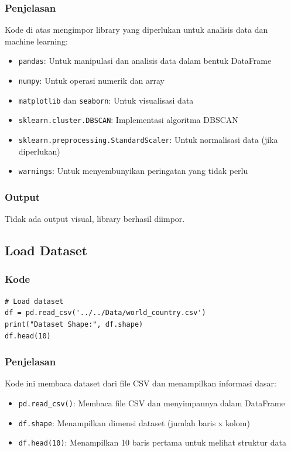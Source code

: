 \documentclass[12pt,a4paper]{article}
\begin{document}
\subsubsection{Penjelasan}
Kode di atas mengimpor library yang diperlukan untuk analisis data dan machine learning:
\begin{itemize}
    \item \texttt{pandas}: Untuk manipulasi dan analisis data dalam bentuk DataFrame
    \item \texttt{numpy}: Untuk operasi numerik dan array
    \item \texttt{matplotlib} dan \texttt{seaborn}: Untuk visualisasi data
    \item \texttt{sklearn.cluster.DBSCAN}: Implementasi algoritma DBSCAN
    \item \texttt{sklearn.preprocessing.StandardScaler}: Untuk normalisasi data (jika diperlukan)
    \item \texttt{warnings}: Untuk menyembunyikan peringatan yang tidak perlu
\end{itemize}

\subsubsection{Output}
Tidak ada output visual, library berhasil diimpor.

\subsection{Load Dataset}

\subsubsection{Kode}
\begin{lstlisting}[style=pythonstyle]
# Load dataset
df = pd.read_csv('../../Data/world_country.csv')
print("Dataset Shape:", df.shape)
df.head(10)
\end{lstlisting}

\subsubsection{Penjelasan}
Kode ini membaca dataset dari file CSV dan menampilkan informasi dasar:
\begin{itemize}
    \item \texttt{pd.read\_csv()}: Membaca file CSV dan menyimpannya dalam DataFrame
    \item \texttt{df.shape}: Menampilkan dimensi dataset (jumlah baris x kolom)
    \item \texttt{df.head(10)}: Menampilkan 10 baris pertama untuk melihat struktur data
\end{itemize}
\end{document}
